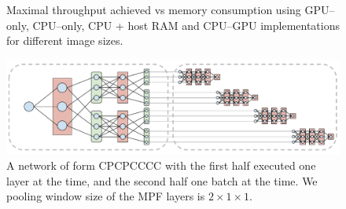\documentclass[conference]{./IEEEtran}
\begin{document}
  \begin{figure}[!htbp]
    \centering

    \caption{Maximal throughput achieved vs memory consumption using
      GPU--only, CPU--only, CPU + host RAM and CPU--GPU
      implementations for different image sizes.}
    \label{fig:final_results}
  \end{figure}

  \begin{figure}
    \begin{center}
      \includegraphics[width=0.99\columnwidth]{layer_vs_batch.pdf}
    \end{center}
    \caption{A network of form CPCPCCCC with the first half executed
      one layer at the time, and the second half one batch at the
      time.  We pooling window size of the MPF layers is $2 \times 1
      \times 1$. }
    \label{fig:layer-vs-batch}
  \end{figure}
\end{document}
